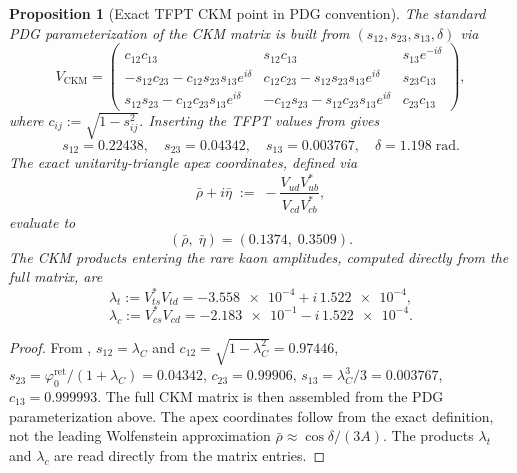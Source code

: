 \documentclass[11pt,a4paper]{article}
\newtheorem{proposition}[theorem]{Proposition}
\theoremstyle{definition}
\theoremstyle{remark}
\newcommand{\phiz}{\varphi_{0}^{\mathrm{ret}}}
\numberwithin{equation}{section}
\begin{document}
\begin{proposition}[Exact TFPT CKM point in PDG convention]
\label{prop:exact-ckm}
The standard PDG parameterization of the CKM matrix is built from
$(s_{12},s_{23},s_{13},\delta)$ via
\[
V_{\mathrm{CKM}}
=
\begin{pmatrix}
c_{12}c_{13} & s_{12}c_{13} & s_{13}e^{-i\delta}\\
-s_{12}c_{23}-c_{12}s_{23}s_{13}e^{i\delta}
& c_{12}c_{23}-s_{12}s_{23}s_{13}e^{i\delta}
& s_{23}c_{13}\\
s_{12}s_{23}-c_{12}c_{23}s_{13}e^{i\delta}
& -c_{12}s_{23}-s_{12}c_{23}s_{13}e^{i\delta}
& c_{23}c_{13}
\end{pmatrix},
\]
where $c_{ij}:=\sqrt{1-s_{ij}^2}$. Inserting the TFPT values from 
gives
\begin{equation}
\label{eq:tfpt-ckm-numerics}
s_{12}=\num{0.22438},
\quad
s_{23}=\num{0.04342},
\quad
s_{13}=\num{0.003767},
\quad
\delta=\num{1.198}\;\mathrm{rad}.
\end{equation}
The exact unitarity-triangle apex coordinates, defined via
\begin{equation}
\label{eq:rhobar-etabar-exact}
\bar\rho+i\bar\eta
\;:=\;
-\frac{V_{ud}V_{ub}^*}{V_{cd}V_{cb}^*},
\end{equation}
evaluate to
\begin{equation}
\label{eq:apex-values}
(\bar\rho,\;\bar\eta)
=
(0.1374,\;0.3509).
\end{equation}
The CKM products entering the rare kaon amplitudes, computed directly from
the full matrix, are
\begin{equation}
\label{eq:lambda-t-exact}
\lambda_t := V_{ts}^*V_{td}
= -\num{3.558e-4}+i\,\num{1.522e-4},
\end{equation}
\begin{equation}
\label{eq:lambda-c-exact}
\lambda_c := V_{cs}^*V_{cd}
= -\num{2.183e-1}-i\,\num{1.522e-4}.
\end{equation}
\end{proposition}

\begin{proof}
From , $s_{12}=\lambda_C$ and
$c_{12}=\sqrt{1-\lambda_C^2}=\num{0.97446}$,
$s_{23}=\phiz/(1+\lambda_C)=\num{0.04342}$,
$c_{23}=\num{0.99906}$,
$s_{13}=\lambda_C^3/3=\num{0.003767}$,
$c_{13}=\num{0.999993}$.
The full CKM matrix is then assembled from the PDG parameterization above.
The apex coordinates  follow from the exact
definition, not the leading Wolfenstein approximation
$\bar\rho\approx\cos\delta/(3A)$.
The products $\lambda_t$ and $\lambda_c$ are read directly from the matrix
entries.
\end{proof}
\end{document}
